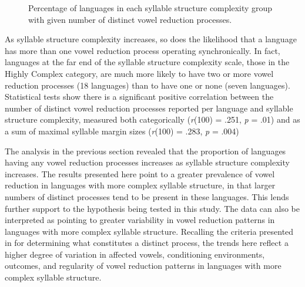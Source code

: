   
\begin{figure}
\caption{\label{fig:6.1}Percentage of languages in each syllable structure complexity group with given number of distinct vowel reduction processes.}
\end{figure}

  As syllable structure complexity increases, so does the likelihood that a language has more than one vowel reduction process operating synchronically. In fact, languages at the far end of the syllable structure complexity scale, those in the Highly Complex category, are much more likely to have two or more vowel reduction processes (18 languages) than to have one or none (seven languages). Statistical tests show there is a significant positive correlation between the number of distinct vowel reduction processes reported per language and syllable structure complexity, measured both categorically (\textit{r}(100) = .251, \textit{p} = .01) and as a sum of maximal syllable margin sizes (\textit{r}(100) = .283, \textit{p} = .004)

  The analysis in the previous section revealed that the proportion of languages having any vowel reduction processes increases as syllable structure complexity increases. The results presented here point to a greater prevalence of vowel reduction in languages with more complex syllable structure, in that larger numbers of distinct processes tend to be present in these languages. This lends further support to the hypothesis being tested in this study. The data can also be interpreted as pointing to greater variability in vowel reduction patterns in languages with more complex syllable structure. Recalling the criteria presented in  for determining what constitutes a distinct process, the trends here reflect a higher degree of variation in affected vowels, conditioning environments, outcomes, and regularity of vowel reduction patterns in languages with more complex syllable structure.


